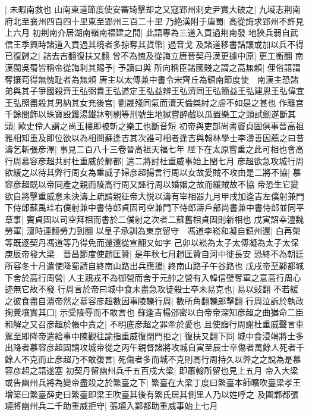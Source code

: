 |{
	未暇南救也}
山南東道節度使安審琦擊却之又寇郢州刺史尹實大破之|{
	九域志荆南府北至襄州四百四十里東至郢州三百二十里}
乃絶漢附于唐蜀|{
	高從誨求郢州不許見上六月}
初荆南介居湖南嶺南福建之間|{
	此語專為三道入貢過荆南發}
地狹兵弱自武信王季興時諸道入貢過其境者多掠奪其貨幣|{
	過音戈}
及諸道移書詰讓或加以兵不得已復歸之|{
	詰去吉翻復扶又翻}
曾不為愧及從誨立唐晉契丹漢更據中原|{
	更工衡翻}
南漢閩吳蜀皆稱帝從誨利其賜予|{
	予讀曰與}
所向稱臣諸國賤之謂之高無賴|{
	俚俗語謂奪攘苟得無愧耻者為無賴}
唐主以太傅兼中書令宋齊丘為鎮南節度使　南漢主恐諸弟與其子爭國殺齊王弘弼貴王弘道定王弘益辨王弘濟同王弘簡益王弘建恩王弘偉宜王弘照盡殺其男納其女充後宫|{
	劉晟殘同氣而瀆天倫桀紂之虐不如是之甚也}
作離宫千餘間飾以珠寶設鑊湯鐵牀刳剔等刑號生地獄嘗醉戲以瓜置樂工之頸試劒遂斷其頭|{
	歐史伶人謂之尚玉樓即被斬之樂工也斷音短}
初帝與吏部尚書竇貞固俱事晉高祖雅相知重及即位欲以為相問蘇逢吉其次誰可相者逢吉與翰林學士李濤善因薦之曰昔濤乞斬張彦澤|{
	事見二百八十三卷晉高祖天福七年}
陛下在太原嘗重之此可相也會高行周慕容彦超共討杜重威於鄴都|{
	遣二將討杜重威事始上閏七月}
彦超欲急攻城行周欲緩之以待其弊行周女為重威子婦彦超揚言行周以女故愛賊不攻由是二將不協|{
	慕容彦超既以帝同產之親而陵高行周又誣行周以婚姻之故而緩賊故不協}
帝恐生它變欲自將擊重威意未決濤上疏請親征帝大悦以濤有宰相器九月甲戌加逢吉左僕射兼門下侍郎蘇禹珪右僕射兼中書侍郎貞固司空兼門下侍郎濤戶部尚書兼中書侍郎並同平章事|{
	竇貞固以司空拜相而書於二僕射之次者二蘇舊相貞固則新相也}
戊寅詔幸澶魏勞軍|{
	澶時連翻勞力到翻}
以皇子承訓為東京留守　馮道李崧和凝自鎮州還|{
	白再榮等既逐契丹馮道等乃得免而還還從宣翻又如字}
己卯以崧為太子太傅凝為太子太保　庚辰帝發大梁　晉昌節度使趙匡贊|{
	是年秋七月趙匡贊自河中徙長安}
恐終不為朝廷所容冬十月遣使降蜀請自終南山路出兵應援|{
	終南山路子午谷路也}
戊戌帝至鄴都城下舍於高行周營|{
	人主親戎不為御營而舍于元帥之營有入韓信壁奪軍之意高行周心迹無它故不發}
行周言於帝曰城中食未盡急攻徒殺士卒未易克也|{
	易以䜴翻}
不若緩之彼食盡自潰帝然之慕容彦超數因事陵轢行周|{
	數所角翻轢郎擊翻}
行周泣訴於執政掬糞壤實其口|{
	示受陵辱而不敢言也}
蘇逢吉楊邠密以白帝帝深知彦超之曲猶命二臣和解之又召彦超於帳中責之|{
	不明底彦超之罪牽於愛也}
且使詣行周謝杜重威聲言車駕至即降帝遣給事中陳觀往諭指重威復閉門拒之|{
	復扶又翻下同}
城中食浸竭將士多出降者慕容彦超固請攻城帝從之丙午親督諸將攻城自寅至辰士卒傷者萬餘人死者千餘人不克而止彦超乃不敢復言|{
	死傷者多而城不克則高行周持久以弊之之說為是慕容彦超之語遂塞}
初契丹留幽州兵千五百戍大梁|{
	即蕭翰所留也見上五月}
帝入大梁或告幽州兵將為變帝盡殺之於繁臺之下|{
	繁臺在大梁丁度曰繁臺本師曠吹臺梁孝王增築曰繁臺薛史曰繁臺即梁王吹臺其後有繁氏居其側里人乃以姓呼之}
及圍鄴都張璉將幽州兵二千助重威拒守|{
	張璉入鄴都助重威事始上七月}
